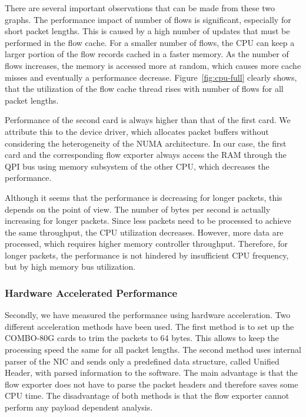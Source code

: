 There are several important observations that can be made from these two graphs. The performance impact of number of flows is significant, especially for short packet lengths. This is caused by a high number of updates that must be performed in the flow cache. For a smaller number of flows, the CPU can keep a larger portion of the flow records cached in a faster memory. As the number of flows increases, the memory is accessed more at random, which causes more cache misses and eventually a performance decrease. Figure~\ref{fig:cpu-full} clearly shows, that the utilization of the flow cache thread rises with number of flows for all packet lengths.

Performance of the second card is always higher than that of the first card. We attribute this to the device driver, which allocates packet buffers without considering the heterogeneity of the NUMA architecture. In our case, the first card and the corresponding flow exporter always access the RAM through the QPI bus using memory subsystem of the other CPU, which decreases the performance.

Although it seems that the performance is decreasing for longer packets, this depends on the point of view. The number of bytes per second is actually increasing for longer packets. Since less packets need to be processed to achieve the same throughput, the CPU utilization decreases. However, more data are processed, which requires higher memory controller throughput. Therefore, for longer packets, the performance is not hindered by insufficient CPU frequency, but by high memory bus utilization.


\subsubsection{Hardware Accelerated Performance}

Secondly, we have measured the performance using hardware acceleration. Two different acceleration methods have been used. The first method is to set up the COMBO-80G cards to trim the packets to 64 bytes. This allows to keep the processing speed the same for all packet lengths. The second method uses internal parser of the NIC and sends only a predefined data structure, called Unified Header, with parsed information to the software. The main advantage is that the flow exporter does not have to parse the packet headers and therefore saves some CPU time. The disadvantage of both methods is that the flow exporter cannot perform any payload dependent analysis.

